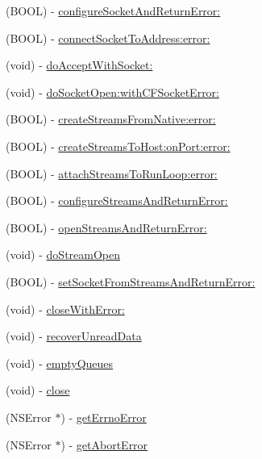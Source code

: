 \begin{DoxyCompactItemize}
(BOOL) -\/ \hyperlink{interface_async_t_c_p_socket_a86039e7b6a55d373fe93d9ee5b06e249}{configureSocketAndReturnError:}
\item 
(BOOL) -\/ \hyperlink{interface_async_t_c_p_socket_a1d6556fc7607459b0a4f59ece23688af}{connectSocketToAddress:error:}
\item 
(void) -\/ \hyperlink{interface_async_t_c_p_socket_a84a0bf0e3edb90de5bfa0c39b788ed96}{doAcceptWithSocket:}
\item 
(void) -\/ \hyperlink{interface_async_t_c_p_socket_ac9f198a9ed1c09c543b9745c71656503}{doSocketOpen:withCFSocketError:}
\item 
(BOOL) -\/ \hyperlink{interface_async_t_c_p_socket_a7a0fb83fd2ec0e82de8c18a5cb6d6b9f}{createStreamsFromNative:error:}
\item 
(BOOL) -\/ \hyperlink{interface_async_t_c_p_socket_ad72f9b820cc46ddb664249be9baf586e}{createStreamsToHost:onPort:error:}
\item 
(BOOL) -\/ \hyperlink{interface_async_t_c_p_socket_a94be748a443d57b698ac5078189f982e}{attachStreamsToRunLoop:error:}
\item 
(BOOL) -\/ \hyperlink{interface_async_t_c_p_socket_afc1e424a8e4971d2e524e73b093898cd}{configureStreamsAndReturnError:}
\item 
(BOOL) -\/ \hyperlink{interface_async_t_c_p_socket_a880586228ff523afc5d1ec48681a6713}{openStreamsAndReturnError:}
\item 
(void) -\/ \hyperlink{interface_async_t_c_p_socket_aac93ce52aa60a6a89ee1a223097513cc}{doStreamOpen}
\item 
(BOOL) -\/ \hyperlink{interface_async_t_c_p_socket_a0f55910b1e0ed121597c2825a693ff50}{setSocketFromStreamsAndReturnError:}
\item 
(void) -\/ \hyperlink{interface_async_t_c_p_socket_ad74a8773cf1c55dfb1fd07be9572d574}{closeWithError:}
\item 
(void) -\/ \hyperlink{interface_async_t_c_p_socket_afe4d1802ff482426cdff4872b07596cd}{recoverUnreadData}
\item 
(void) -\/ \hyperlink{interface_async_t_c_p_socket_a380f6dc6ed4dfc3a60b33d7ed6e65c73}{emptyQueues}
\item 
(void) -\/ \hyperlink{interface_async_t_c_p_socket_a5ae591df94fc66ccb85cbb6565368bca}{close}
\item 
(NSError $\ast$) -\/ \hyperlink{interface_async_t_c_p_socket_a804640cdef7c41b9d00db44feb235149}{getErrnoError}
\item 
(NSError $\ast$) -\/ \hyperlink{interface_async_t_c_p_socket_a485ee0cb720094374011c7c836693194}{getAbortError}

\end{DoxyCompactItemize}
